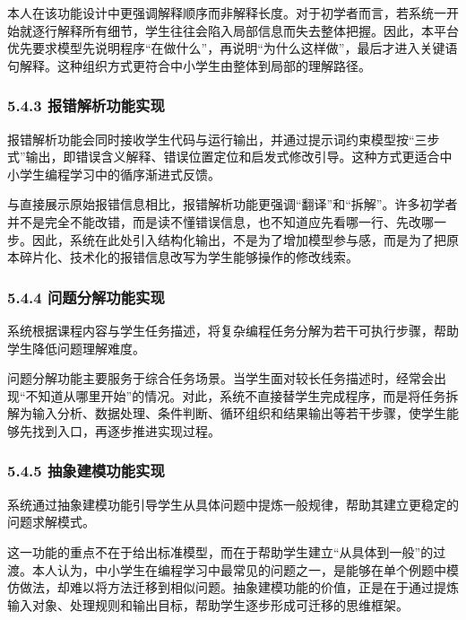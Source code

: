 本人在该功能设计中更强调解释顺序而非解释长度。对于初学者而言，若系统一开始就逐行解释所有细节，学生往往会陷入局部信息而失去整体把握。因此，本平台优先要求模型先说明程序``在做什么''，再说明``为什么这样做''，最后才进入关键语句解释。这种组织方式更符合中小学生由整体到局部的理解路径。

\subsubsection{5.4.3 报错解析功能实现}\label{ux62a5ux9519ux89e3ux6790ux529fux80fdux5b9eux73b0}

报错解析功能会同时接收学生代码与运行输出，并通过提示词约束模型按``三步式''输出，即错误含义解释、错误位置定位和启发式修改引导。这种方式更适合中小学生编程学习中的循序渐进式反馈。

与直接展示原始报错信息相比，报错解析功能更强调``翻译''和``拆解''。许多初学者并不是完全不能改错，而是读不懂错误信息，也不知道应先看哪一行、先改哪一步。因此，系统在此处引入结构化输出，不是为了增加模型参与感，而是为了把原本碎片化、技术化的报错信息改写为学生能够操作的修改线索。

\subsubsection{5.4.4 问题分解功能实现}\label{ux95eeux9898ux5206ux89e3ux529fux80fdux5b9eux73b0}

系统根据课程内容与学生任务描述，将复杂编程任务分解为若干可执行步骤，帮助学生降低问题理解难度。

问题分解功能主要服务于综合任务场景。当学生面对较长任务描述时，经常会出现``不知道从哪里开始''的情况。对此，系统不直接替学生完成程序，而是将任务拆解为输入分析、数据处理、条件判断、循环组织和结果输出等若干步骤，使学生能够先找到入口，再逐步推进实现过程。

\subsubsection{5.4.5 抽象建模功能实现}\label{ux62bdux8c61ux5efaux6a21ux529fux80fdux5b9eux73b0}

系统通过抽象建模功能引导学生从具体问题中提炼一般规律，帮助其建立更稳定的问题求解模式。

这一功能的重点不在于给出标准模型，而在于帮助学生建立``从具体到一般''的过渡。本人认为，中小学生在编程学习中最常见的问题之一，是能够在单个例题中模仿做法，却难以将方法迁移到相似问题。抽象建模功能的价值，正是在于通过提炼输入对象、处理规则和输出目标，帮助学生逐步形成可迁移的思维框架。


